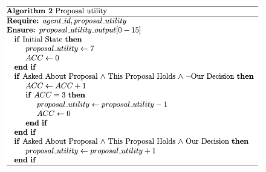 
\begin{figure}[htb]
    \centering
    \includegraphics[scale=0.7]{006_team_3_agent_design/FIGS/Algo2.png}
    \label{fig:algo2}
\end{figure}



